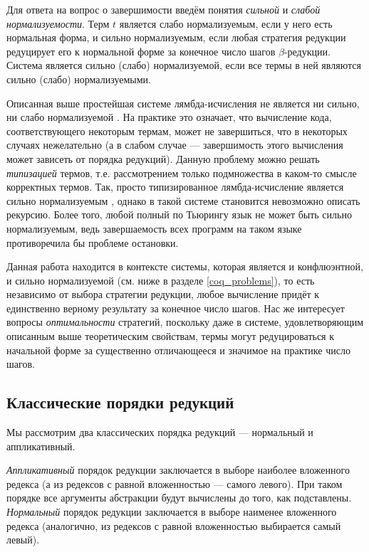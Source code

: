 \documentclass[../diploma.tex]{subfiles}
\begin{document}
Для ответа на вопрос о завершимости введём понятия \textit{сильной} и \textit{слабой нормализуемости}. Терм $t$ является слабо нормализуемым, если у него есть нормальная форма, и сильно нормализуемым, если любая стратегия редукции редуцирует его к нормальной форме за конечное число шагов $\beta$-редукции. Система является сильно (слабо) нормализуемой, если все термы в ней являются сильно (слабо) нормализуемыми.

Описанная выше простейшая системе лямбда-исчисления не является ни сильно, ни слабо нормализуемой \cite{lambda_calculus}. На практике это означает, что вычисление кода, соответствующего некоторым термам, может не завершиться, что в некоторых случаях нежелательно (а в слабом случае --- завершимость этого вычисления может зависеть от порядка редукций). Данную проблему можно решать \textit{типизацией} термов, т.е. рассмотрением только подмножества в каком-то смысле корректных термов. Так, просто типизированное лямбда-исчисление является сильно нормализуемым \cite{lambda_calculus}, однако в такой системе становится невозможно описать рекурсию. Более того, любой полный по Тьюрингу язык не может быть сильно нормализуемым, ведь завершаемость всех программ на таком языке противоречила бы проблеме остановки.

Данная работа находится в контексте системы, которая является и конфлюэнтной, и сильно нормализуемой (см. ниже в разделе \ref{coq_problems}), то есть независимо от выбора стратегии редукции, любое вычисление придёт к единственно верному результату за конечное число шагов. Нас же интересует вопросы \textit{оптимальности} стратегий, поскольку даже в системе, удовлетворяющим описанным выше теоретическим свойствам, термы могут редуцироваться к начальной форме за существенно отличающееся и значимое на практике число шагов.

\subsection{Классические порядки редукций} \label{orders}

Мы рассмотрим два классических порядка редукций --- нормальный и аппликативный. 

\textit{Аппликативный} порядок редукции заключается в выборе наиболее вложенного редекса (а из редексов с равной вложенностью --- самого левого). При таком порядке все аргументы абстракции будут вычислены до того, как подставлены. \textit{Нормальный} порядок редукции заключается в выборе наименее вложенного редекса (аналогично, из редексов с равной вложенностью выбирается самый левый).
\end{document}
